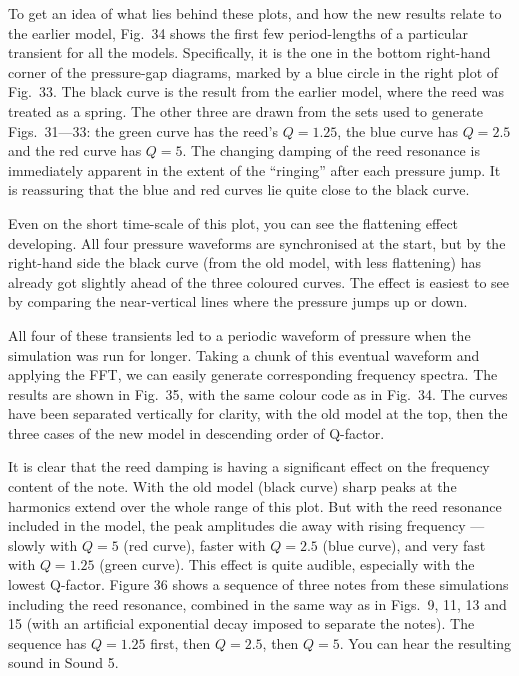   To get an idea of what lies behind these plots, and how the new results 
  relate to the earlier model, Fig.\ 34 shows the first few period-lengths of a 
  particular transient for all the models. Specifically, it is the one in the 
  bottom right-hand corner of the pressure-gap diagrams, marked by a blue 
  circle in the right plot of Fig.\ 33. The black curve is the result from the 
  earlier model, where the reed was treated as a spring. The other three are 
  drawn from the sets used to generate Figs.\ 31—33: the green curve has the 
  reed’s $Q=1.25$, the blue curve has $Q=2.5$ and the red curve has $Q=5$. The 
  changing damping of the reed resonance is immediately apparent in the extent 
  of the “ringing” after each pressure jump. It is reassuring that the blue and 
  red curves lie quite close to the black curve. 

  Even on the short time-scale of this plot, you can see the flattening effect 
  developing. All four pressure waveforms are synchronised at the start, but by 
  the right-hand side the black curve (from the old model, with less 
  flattening) has already got slightly ahead of the three coloured curves. The 
  effect is easiest to see by comparing the near-vertical lines where the 
  pressure jumps up or down. 

  All four of these transients led to a periodic waveform of pressure when the 
  simulation was run for longer. Taking a chunk of this eventual waveform and 
  applying the FFT, we can easily generate corresponding frequency spectra. The 
  results are shown in Fig.\ 35, with the same colour code as in Fig.\ 34. The 
  curves have been separated vertically for clarity, with the old model at the 
  top, then the three cases of the new model in descending order of Q-factor. 

  It is clear that the reed damping is having a significant effect on the 
  frequency content of the note. With the old model (black curve) sharp peaks 
  at the harmonics extend over the whole range of this plot. But with the reed 
  resonance included in the model, the peak amplitudes die away with rising 
  frequency — slowly with $Q=5$ (red curve), faster with $Q=2.5$ (blue curve), 
  and very fast with $Q=1.25$ (green curve). This effect is quite audible, 
  especially with the lowest Q-factor. Figure 36 shows a sequence of three 
  notes from these simulations including the reed resonance, combined in the 
  same way as in Figs.\ 9, 11, 13 and 15 (with an artificial exponential decay 
  imposed to separate the notes). The sequence has $Q=1.25$ first, then 
  $Q=2.5$, then $Q=5$. You can hear the resulting sound in Sound 5. 

